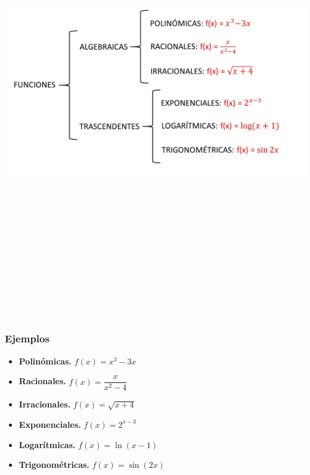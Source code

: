 \includegraphics[width=40cm, height=20cm]{samples/propiedades/clasificaEsquema2.jpg}
\subsubsection{Ejemplos}
\begin{itemize}
	\item \textbf{Polinómicas.}
	$f(x) = x^3-3x$
	\item \textbf{Racionales.}
	$f(x) = \dfrac{x}{x^2-4}$
	\item \textbf{Irracionales.}
	$f(x) = \sqrt{x+4}$
	\item \textbf{Exponenciales.}
	$f(x) = 2^{x-3}$
	\item \textbf{Logarítmicas.}
	$f(x) = \ln (x-1)$
	\item \textbf{Trigonométricas.}
	$f(x) = \sin(2x)$
\end{itemize}